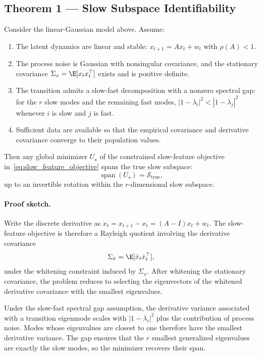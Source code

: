 \subsection{Theorem 1 --- Slow Subspace Identifiability}

\begin{theorem}
\label{thm:slow_subspace_identifiability}
Consider the linear-Gaussian model above. Assume:
\begin{enumerate}
    \item The latent dynamics are linear and stable: $x_{t+1}=Ax_t+w_t$ with
    $\rho(A)<1$.
    \item The process noise is Gaussian with nonsingular covariance, and the
    stationary covariance $\Sigma_x=\E[x_t x_t^\top]$ exists and is positive
    definite.
    \item The transition admits a slow-fast decomposition with a nonzero
    spectral gap: for the $r$ slow modes and the remaining fast modes,
    $|1-\lambda_i|^2 < |1-\lambda_j|^2$ whenever $i$ is slow and $j$ is fast.
    \item Sufficient data are available so that the empirical covariance and
    derivative covariance converge to their population values.
\end{enumerate}
Then any global minimizer $U_\star$ of the constrained slow-feature objective
in~\eqref{eq:slow_feature_objective} spans the true slow subspace:
\begin{equation}
    \operatorname{span}(U_\star) = \mathcal{S}_{\mathrm{true}},
\end{equation}
up to an invertible rotation within the $r$-dimensional slow subspace.
\end{theorem}

\paragraph{Proof sketch.}
Write the discrete derivative as $\dot{x}_t=x_{t+1}-x_t=(A-I)x_t+w_t$.
The slow-feature objective is therefore a Rayleigh quotient involving the
derivative covariance
\begin{equation}
    \Sigma_{\dot{x}} = \E[\dot{x}_t \dot{x}_t^\top],
\end{equation}
under the whitening constraint induced by $\Sigma_x$. After whitening the
stationary covariance, the problem reduces to selecting the eigenvectors of the
whitened derivative covariance with the smallest eigenvalues.

Under the slow-fast spectral gap assumption, the derivative variance associated
with a transition eigenmode scales with $|1-\lambda_i|^2$ plus the contribution
of process noise. Modes whose eigenvalues are closest to one therefore have the
smallest derivative variance. The gap ensures that the $r$ smallest generalized
eigenvalues are exactly the slow modes, so the minimizer recovers their span.

